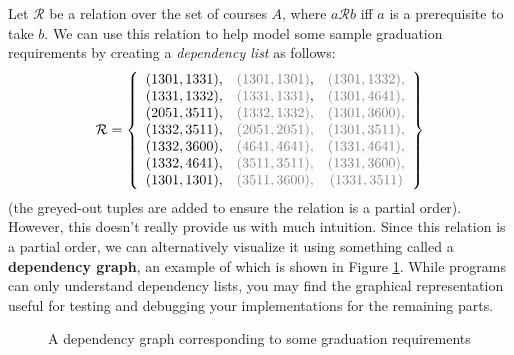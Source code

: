 \documentclass{article}
\newcommand{\gray}[1]{\textcolor{gray}{#1}}
\begin{document}
    Let $\mathcal{R}$ be a relation over the set of courses $A$, where $a \mathcal{R} b$ iff $a$ is a prerequisite to take $b$. We can use this relation to help model some sample graduation requirements by creating a \textit{dependency list} as follows:
    $$\mathcal{R} = 
    \left\{
    \begin{array}{ccc}
        (1301, 1331), & \gray{(1301, 1301)}, & \gray{(1301, 1332),} \\
        (1331, 1332), & \gray{(1331, 1331)}, & \gray{(1301, 4641),} \\
        (2051, 3511), & \gray{(1332, 1332),} & \gray{(1301, 3600),} \\
        (1332, 3511), & \gray{(2051, 2051),} & \gray{(1301, 3511),} \\
        (1332, 3600), & \gray{(4641, 4641),} & \gray{(1331, 4641),} \\
        (1332, 4641), & \gray{(3511, 3511),} & \gray{(1331, 3600),} \\
        (1301, 1301), & \gray{(3511, 3600),} & \gray{(1331, 3511)} \\
    \end{array}
    \right\}$$
    (the greyed-out tuples are added to ensure the relation is a partial order). However, this doesn't really provide us with much intuition. Since this relation is a partial order, we can alternatively visualize it using something called a \textbf{dependency graph}, an example of which is shown in Figure \ref{fig:dependency_graph}. While programs can only understand dependency lists, you may find the graphical representation useful for testing and debugging your implementations for the remaining parts.
    
    \begin{figure}[htbp]
            \centering
            \caption{A dependency graph corresponding to some graduation requirements}
            \label{fig:dependency_graph}
        \end{figure}
\end{document}
